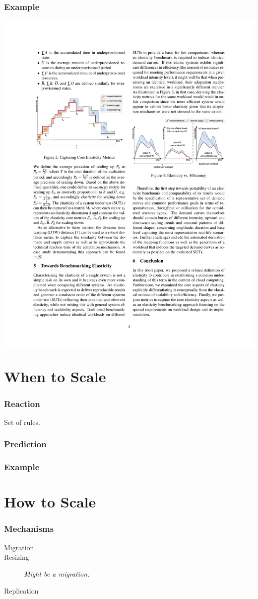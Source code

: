 \documentclass{beamer}
\begin{document}
\begin{frame}
  \frametitle{Example}
  \colorbox{white}{\includegraphics{images/workload}}
\end{frame}


\section{When to Scale}
\begin{frame}
  \frametitle{Reaction}
  Set of rules.
\end{frame}

\begin{frame}
  \frametitle{Prediction}
\end{frame}

\begin{frame}
  \frametitle{Example}
\end{frame}


\section{How to Scale}
\begin{frame}
  \frametitle{Mechanisms}
  \begin{description}
    \item[Migration]
    \item[Resizing] \textit{Might be a migration.}
    \item[Replication]
  \end{description}
\end{frame}
\end{document}
